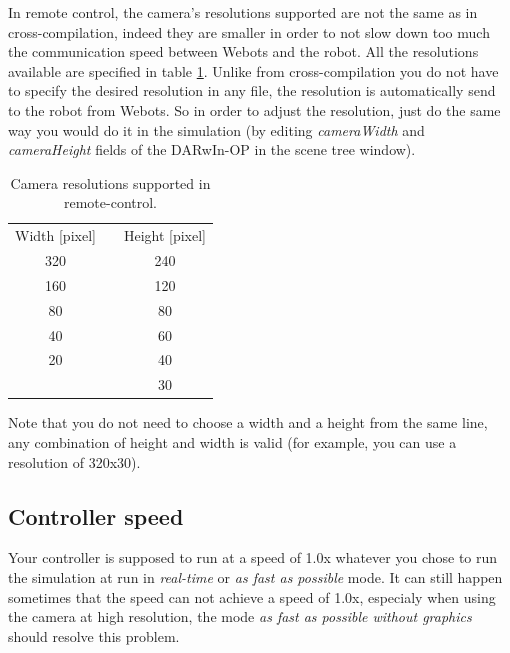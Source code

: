 \documentclass[a4paper, 12pt]{article}  		%
\begin{document}
In remote control, the camera's resolutions supported are not the same as in cross-compilation, indeed they are smaller in order to not slow down too much the communication speed between Webots and the robot. All the resolutions available are specified in table \ref{tab:cameraRemoteResolution}. Unlike from cross-compilation you do not have to specify the desired resolution in any file, the resolution is automatically send to the robot from Webots. So in order to adjust the resolution, just do the same way you would do it in the simulation (by editing \textit{cameraWidth} and \textit{cameraHeight} fields of the DARwIn-OP in the scene tree window).\\

\begin{table}[H]
\begin{center}
\begin{tabular}{| c | p{1cm} | c | }
\cline{1-1} \cline{3-3}
Width [pixel] &   & Height [pixel]\\ 
\cline{1-1} \cline{3-3}
\cline{1-1} \cline{3-3}
 320 &   & 240 \\
\cline{1-1} \cline{3-3}
160 &  & 120 \\
\cline{1-1} \cline{3-3}
80 &  & 80 \\
\cline{1-1} \cline{3-3}
40 &  & 60 \\
\cline{1-1} \cline{3-3}
20 &  & 40 \\
\cline{1-1}  \cline{3-3}
\multicolumn{1}{l}{}  &  & 30 \\
\cline{3-3}
\end{tabular}
\caption{Camera resolutions supported in remote-control.}
\label{tab:cameraRemoteResolution}
\end{center}
\end{table}

Note that you do not need to choose a width and a height from the same line, any combination of height and width is valid (for example, you can use a resolution of 320x30).\\

\subsection{Controller speed}
Your controller is supposed to run at a speed of 1.0x whatever you chose to run the simulation at run in \textit{real-time} or \textit{as fast as possible} mode. It can still happen sometimes that the speed can not achieve a speed of 1.0x, especialy when using the camera at high resolution, the mode \textit{as fast as possible without graphics} should resolve this problem.\\
\end{document}
